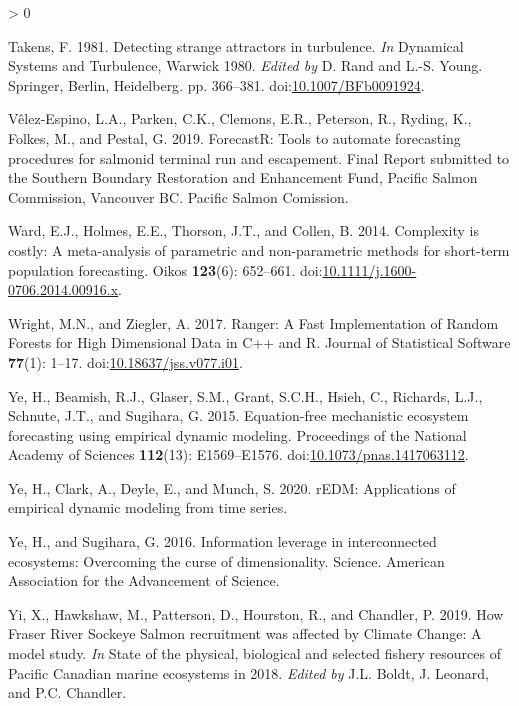 \documentclass[
]{article}
\newlength{\cslhangindent}
\newenvironment{CSLReferences}[2] %
 {%
  \setlength{\parindent}{0pt}
  \ifodd #1 \everypar{\setlength{\hangindent}{\cslhangindent}}\ignorespaces\fi
  \ifnum #2 > 0
  \setlength{\parskip}{#2\baselineskip}
  \fi
 }%
 {}
\begin{document}
\begin{CSLReferences}{1}{0}
\leavevmode\hypertarget{ref-takens1981}{}%
Takens, F. 1981. Detecting strange attractors in turbulence. \emph{In} Dynamical {Systems} and {Turbulence}, {Warwick} 1980. \emph{Edited by} D. Rand and L.-S. Young. {Springer}, {Berlin, Heidelberg}. pp. 366--381. doi:\href{https://doi.org/10.1007/BFb0091924}{10.1007/BFb0091924}.

\leavevmode\hypertarget{ref-velez-espino2019}{}%
Vêlez-Espino, L.A., Parken, C.K., Clemons, E.R., Peterson, R., Ryding, K., Folkes, M., and Pestal, G. 2019. {ForecastR}: Tools to automate forecasting procedures for salmonid terminal run and escapement. {Final Report} submitted to the {Southern Boundary Restoration} and {Enhancement Fund}, {Pacific Salmon Commission}, {Vancouver BC}. {Pacific Salmon Comission}.

\leavevmode\hypertarget{ref-ward2014}{}%
Ward, E.J., Holmes, E.E., Thorson, J.T., and Collen, B. 2014. Complexity is costly: A meta-analysis of parametric and non-parametric methods for short-term population forecasting. Oikos \textbf{123}(6): 652--661. doi:\href{https://doi.org/10.1111/j.1600-0706.2014.00916.x}{10.1111/j.1600-0706.2014.00916.x}.

\leavevmode\hypertarget{ref-wright2017}{}%
Wright, M.N., and Ziegler, A. 2017. Ranger: {A Fast Implementation} of {Random Forests} for {High Dimensional Data} in {C}++ and {R}. Journal of Statistical Software \textbf{77}(1): 1--17. doi:\href{https://doi.org/10.18637/jss.v077.i01}{10.18637/jss.v077.i01}.

\leavevmode\hypertarget{ref-ye2015}{}%
Ye, H., Beamish, R.J., Glaser, S.M., Grant, S.C.H., Hsieh, C., Richards, L.J., Schnute, J.T., and Sugihara, G. 2015. Equation-free mechanistic ecosystem forecasting using empirical dynamic modeling. Proceedings of the National Academy of Sciences \textbf{112}(13): E1569--E1576. doi:\href{https://doi.org/10.1073/pnas.1417063112}{10.1073/pnas.1417063112}.

\leavevmode\hypertarget{ref-ye2020}{}%
Ye, H., Clark, A., Deyle, E., and Munch, S. 2020. rEDM: Applications of empirical dynamic modeling from time series.

\leavevmode\hypertarget{ref-ye2016}{}%
Ye, H., and Sugihara, G. 2016. Information leverage in interconnected ecosystems: {Overcoming} the curse of dimensionality. Science. {American Association for the Advancement of Science}.

\leavevmode\hypertarget{ref-yi2019}{}%
Yi, X., Hawkshaw, M., Patterson, D., Hourston, R., and Chandler, P. 2019. How {Fraser River Sockeye Salmon} recruitment was affected by {Climate Change}: {A} model study. \emph{In} State of the physical, biological and selected fishery resources of {Pacific Canadian} marine ecosystems in 2018. \emph{Edited by} J.L. Boldt, J. Leonard, and P.C. Chandler.

\end{CSLReferences}
\end{document}
